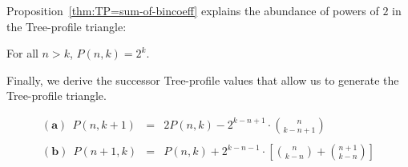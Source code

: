 \noindent
Proposition~\ref{thm:TP=sum-of-bincoeff} explains the abundance of powers of $2$ in the Tree-profile triangle:

\begin{corol}
For all $n > k$, $P(n,k) = 2^k$.
\end{corol}

\medskip

Finally, we derive the successor Tree-profile values that allow us to generate the Tree-profile triangle.

\begin{prop}
\label{thm:successor-TP-values}
\begin{eqnarray*}
\nonumber
\mathbf{(a)} \ \
P(n, k+1) & = & 
  2 P(n,k) - 2^{k-n+1} \cdot {n \choose {k-n+1}} \\
\label{eq:successor-TP-values}
          &   & \\
\nonumber
\mathbf{(b)} \ \
P(n+1, k) & = &
  P(n,k) + 2^{k-n-1} \cdot \left[ {n \choose {k-n}} + {{n+1} \choose {k-n}} \right]
\end{eqnarray*}
\end{prop}

